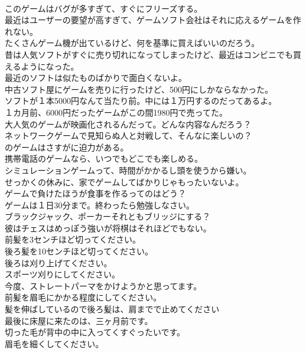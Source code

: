 \documentclass[8pt]{extreport}
\begin{document}
\begin{CJK}{UTF8}{min}
\\	このゲームはバグが多すぎて、すぐにフリーズする。	
\\	最近はユーザーの要望が高すぎて、ゲームソフト会社はそれに応えるゲームを作れない。	
\\	たくさんゲーム機が出ているけど、何を基準に買えばいいのだろう。	
\\	昔は人気ソフトがすぐに売り切れになってしまったけど、最近はコンビニでも買えるようになった。	
\\	最近のソフトは似たものばかりで面白くないよ。	
\\	中古ソフト屋にゲームを売りに行ったけど、500円にしかならなかった。	
\\	ソフトが１本5000円なんて当たり前。中には１万円するのだってあるよ。	
\\	１カ月前、6000円だったゲームがこの間1980円で売ってた。	
\\	大人気のゲームが映画化されるんだって。どんな内容なんだろう？	
\\	ネットワークゲームで見知らぬ人と対戦して、そんなに楽しいの？	
\\	のゲームはさすがに迫力がある。	
\\	携帯電話のゲームなら、いつでもどこでも楽しめる。	
\\	シミュレーションゲームって、時間がかかるし頭を使うから嫌い。	
\\	せっかくの休みに、家でゲームしてばかりじゃもったいないよ。	
\\	ゲームで負けたほうが食事を作るってのはどう？	
\\	ゲームは１日30分まで。終わったら勉強しなさい。	
\\	ブラックジャック、ポーカーそれともブリッジにする？	
\\	彼はチェスはめっぽう強いが将棋はそれほどでもない。	
\\	前髪を3センチほど切ってください。	
\\	後ろ髪を10センチほど切ってください。	
\\	後ろは刈り上げてください。	
\\	スポーツ刈りにしてください。	
\\	今度、ストレートパーマをかけようかと思ってます。	
\\	前髪を眉毛にかかる程度にしてください。	
\\	髪を伸ばしているので後ろ髪は、肩までで止めてください	
\\	最後に床屋に来たのは、三ヶ月前です。	
\\	切った毛が背中の中に入ってくすぐったいです。	
\\	眉毛を細くしてください。	

\end{CJK}
\end{document}
